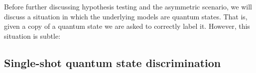%
%

Before further discussing hypothesis testing and the asymmetric scenario, we will discuss a situation in which the underlying models are quantum states. That is, given a copy of a quantum state we are asked to correctly label it. However, this situation is subtle: 
\subsection{Single-shot quantum state discrimination}\label{sec:1_qdisc}


